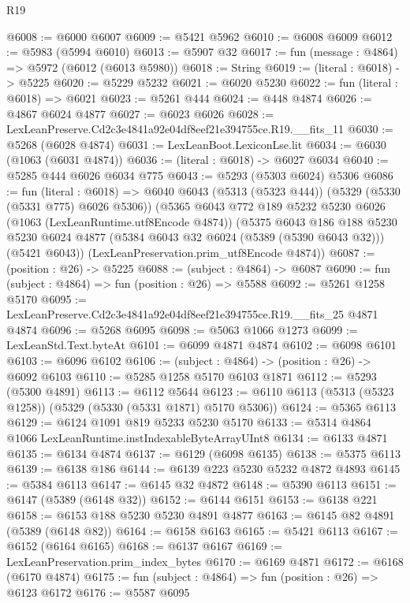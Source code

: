 \begin{lexlean}{R19}
\begin{coremodule}
@6008 := @6000 @6007
@6009 := @5421 @5962
@6010 := @6008 @6009
@6012 := @5983 (@5994 @6010)
@6013 := @5907 @32
@6017 := fun (message : @4864) => @5972 (@6012 (@6013 @5980))
@6018 := String
@6019 := (literal : @6018) -> @5225
@6020 := @5229 @5232
@6021 := @6020 @5230
@6022 := fun (literal : @6018) => @6021
@6023 := @5261 @444
@6024 := @448 @4874
@6026 := @4867 @6024 @4877
@6027 := @6023 @6026
@6028 := LexLeanPreserve.Cd2c3e4841a92e04df8eef21e394755ce.R19.__fits_11
@6030 := @5268 (@6028 @4874)
@6031 := LexLeanBoot.LexiconLse.lit
@6034 := @6030 (@1063 (@6031 @4874))
@6036 := (literal : @6018) -> @6027 @6034
@6040 := @5285 @444 @6026 @6034 @775
@6043 := @5293 (@5303 @6024) @5306
@6086 := fun (literal : @6018) =>
  @6040
    @6043
    (@5313 (@5323 @444))
    (@5329 (@5330 (@5331 @775) @6026 @5306))
    (@5365
      @6043
      @772
      @189
      @5232
      @5230
      @6026
      (@1063 (LexLeanRuntime.utf8Encode @4874))
      (@5375
        @6043
        @186
        @188
        @5230
        @5230
        @6024
        @4877
        (@5384 @6043 @32 @6024 (@5389 (@5390 @6043 @32)))
        (@5421 @6043))
      (LexLeanPreservation.prim_utf8Encode @4874))
@6087 := (position : @26) -> @5225
@6088 := (subject : @4864) -> @6087
@6090 := fun (subject : @4864) => fun (position : @26) => @5588
@6092 := @5261 @1258 @5170
@6095 := LexLeanPreserve.Cd2c3e4841a92e04df8eef21e394755ce.R19.__fits_25 @4871 @4874
@6096 := @5268 @6095
@6098 := @5063 @1066 @1273
@6099 := LexLeanStd.Text.byteAt
@6101 := @6099 @4871 @4874
@6102 := @6098 @6101
@6103 := @6096 @6102
@6106 := (subject : @4864) -> (position : @26) -> @6092 @6103
@6110 := @5285 @1258 @5170 @6103 @1871
@6112 := @5293 (@5300 @4891)
@6113 := @6112 @5644
@6123 := @6110 @6113 (@5313 (@5323 @1258)) (@5329 (@5330 (@5331 @1871) @5170 @5306))
@6124 := @5365 @6113
@6129 := @6124 @1091 @819 @5233 @5230 @5170
@6133 := @5314 @4864 @1066 LexLeanRuntime.instIndexableByteArrayUInt8
@6134 := @6133 @4871
@6135 := @6134 @4874
@6137 := @6129 (@6098 @6135)
@6138 := @5375 @6113
@6139 := @6138 @186
@6144 := @6139 @223 @5230 @5232 @4872 @4893
@6145 := @5384 @6113
@6147 := @6145 @32 @4872
@6148 := @5390 @6113
@6151 := @6147 (@5389 (@6148 @32))
@6152 := @6144 @6151
@6153 := @6138 @221
@6158 := @6153 @188 @5230 @5230 @4891 @4877
@6163 := @6145 @82 @4891 (@5389 (@6148 @82))
@6164 := @6158 @6163
@6165 := @5421 @6113
@6167 := @6152 (@6164 @6165)
@6168 := @6137 @6167
@6169 := LexLeanPreservation.prim_index_bytes
@6170 := @6169 @4871
@6172 := @6168 (@6170 @4874)
@6175 := fun (subject : @4864) => fun (position : @26) => @6123 @6172
@6176 := @5587 @6095

\end{coremodule}
\end{lexlean}
